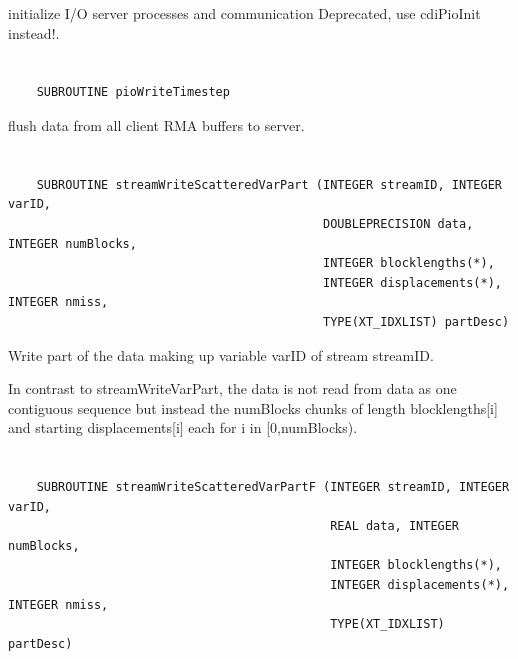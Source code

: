 initialize I/O server processes and communication
Deprecated, use cdiPioInit instead!.


\section*{\tt {}}

\begin{verbatim}
    SUBROUTINE pioWriteTimestep
\end{verbatim}

flush data from all client RMA buffers to server.


\section*{\tt {}}

\begin{verbatim}
    SUBROUTINE streamWriteScatteredVarPart (INTEGER streamID, INTEGER varID,
                                            DOUBLEPRECISION data, INTEGER numBlocks,
                                            INTEGER blocklengths(*),
                                            INTEGER displacements(*), INTEGER nmiss,
                                            TYPE(XT_IDXLIST) partDesc)
\end{verbatim}

Write part of the data making up
variable varID of stream streamID.

In contrast to streamWriteVarPart, the data is not read from data as one
contiguous sequence but instead the numBlocks chunks of length
blocklengths[i] and starting displacements[i] each for i in [0,numBlocks).


\section*{\tt {}}

\begin{verbatim}
    SUBROUTINE streamWriteScatteredVarPartF (INTEGER streamID, INTEGER varID,
                                             REAL data, INTEGER numBlocks,
                                             INTEGER blocklengths(*),
                                             INTEGER displacements(*), INTEGER nmiss,
                                             TYPE(XT_IDXLIST) partDesc)
\end{verbatim}

